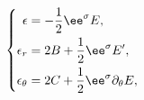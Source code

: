 \begin{equation}
\left\{
\begin{aligned}
\epsilon &= \displaystyle -{1\over 2} \ee^\sigma E,\\
\epsilon_r &= \displaystyle 2B+{1\over 2} \ee^\sigma E',\\
\epsilon_\theta &= \displaystyle 2C+{1\over 2} \ee^\sigma \partial_\theta E,
\end{aligned}
\right.
\end{equation}

